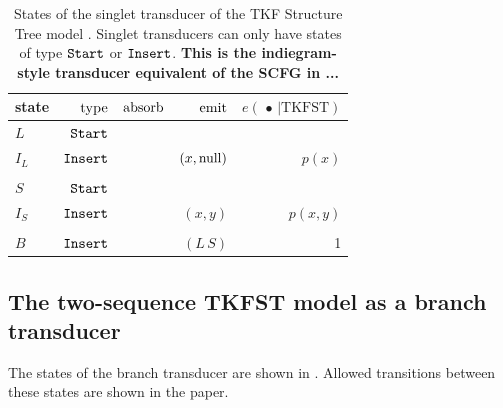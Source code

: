 \documentclass[10pt]{article}
\begin{document}
\begin{table}[!ht]
  \centering
  \begin{tabular}{lrrrr}
    state & $\operatorname{type}$ & $\operatorname{absorb}$ & $\operatorname{emit}$ & $e(\,\bullet\,|\mathrm{TKFST})$ \\ \hline
    $L$ & $\mathtt{Start}$ \\
    $I_L$ & $\mathtt{Insert}$ & & $(x,\mathrm{null})$ & $p(x)$ \\
    \\
    $S$ & $\mathtt{Start}$ \\
    $I_S$ & $\mathtt{Insert}$ & & $(x,y)$ & $p(x,y)$ \\
    \\
    $B$ & $\mathtt{Insert}$ & & $(L\,S)$ & 1 \\
  \end{tabular}
  \caption{
    States of the singlet transducer of the TKF Structure Tree model \cite{Holmes2004}.
    Singlet transducers can only have states of type $\mathtt{Start}$ or $\mathtt{Insert}$.
    {\bf This is the indiegram-style transducer equivalent of the SCFG in  ...}
  }
\end{table}


\subsection{The two-sequence TKFST model as a branch transducer}

The states of the branch transducer are shown in .
Allowed transitions between these states are shown in the paper.
\end{document}
